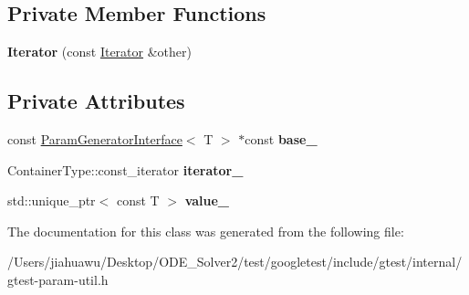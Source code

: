 \subsection*{Private Member Functions}
\begin{DoxyCompactItemize}
\item 
\mbox{\label{classtesting_1_1internal_1_1_values_in_iterator_range_generator_1_1_iterator_a87cadeed020bb8bfbdce636fca31b9ef}} 
{\bfseries Iterator} (const \mbox{\hyperlink{classtesting_1_1internal_1_1_values_in_iterator_range_generator_1_1_iterator}{Iterator}} \&other)
\end{DoxyCompactItemize}
\subsection*{Private Attributes}
\begin{DoxyCompactItemize}
\item 
\mbox{\label{classtesting_1_1internal_1_1_values_in_iterator_range_generator_1_1_iterator_a904df7e46beda1ce5ac2c0ecd6680e0d}} 
const \mbox{\hyperlink{classtesting_1_1internal_1_1_param_generator_interface}{Param\+Generator\+Interface}}$<$ T $>$ $\ast$const {\bfseries base\+\_\+}
\item 
\mbox{\label{classtesting_1_1internal_1_1_values_in_iterator_range_generator_1_1_iterator_aaff15b9f8addac71b91c32053bf9ea1e}} 
Container\+Type\+::const\+\_\+iterator {\bfseries iterator\+\_\+}
\item 
\mbox{\label{classtesting_1_1internal_1_1_values_in_iterator_range_generator_1_1_iterator_af51f1a21ffb0cd531de7574f4ad1f9b6}} 
std\+::unique\+\_\+ptr$<$ const T $>$ {\bfseries value\+\_\+}
\end{DoxyCompactItemize}


The documentation for this class was generated from the following file\+:\begin{DoxyCompactItemize}
\item 
/\+Users/jiahuawu/\+Desktop/\+O\+D\+E\+\_\+\+Solver2/test/googletest/include/gtest/internal/gtest-\/param-\/util.\+h\end{DoxyCompactItemize}
